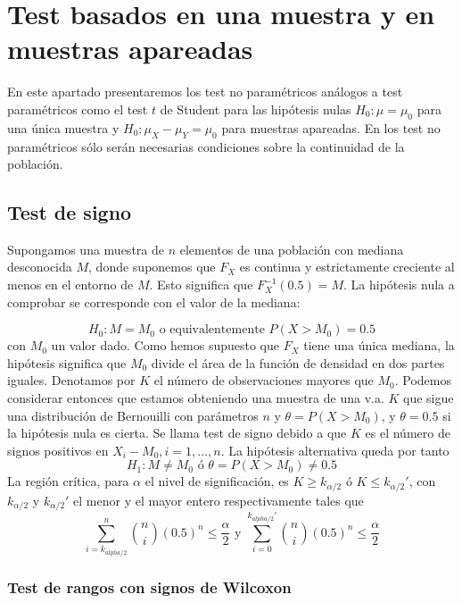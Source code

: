 \section{Test basados en una muestra y en muestras apareadas}
	
	En este apartado presentaremos los test no paramétricos 
análogos a test paramétricos como el test $t$ de Student para 
las hipótesis nulas $H_0: \mu = \mu_0$ para una única muestra 
y $H_0: \mu_X - \mu_Y = \mu_0$ para muestras apareadas. En 
los test no paramétricos sólo serán necesarias condiciones 
sobre la continuidad de la población. 
	
\subsection{Test de signo}

	Supongamos una muestra de $n$ elementos de una población 
con mediana desconocida $M$, donde suponemos que $F_X$ 
es continua y estrictamente creciente al menos en el entorno 
de $M$. Esto significa que $F_X^{-1}(0.5) = M$. La hipótesis 
nula a comprobar se corresponde con el valor de la mediana:

	\[ H_0: M = M_0	\text{ o equivalentemente }
			P(X > M_0) = 0.5 \]
	con $M_0$ un valor dado. Como hemos supuesto que $F_X$ 
tiene una única mediana, la hipótesis significa que $M_0$ 
divide el área de la función de densidad en dos partes 
iguales. Denotamos por $K$ el número de observaciones mayores 
que $M_0$. Podemos considerar entonces que estamos obteniendo 
una muestra de una v.a. $K$ que sigue una distribución de 
Bernouilli con parámetros $n$ y $\theta=P(X>M_0)$, y 
$\theta=0.5$ si la hipótesis nula es cierta. Se llama test de 
signo debido a que $K$ es el número de signos positivos en 
$X_i - M_0, i = 1, \dots, n$. La hipótesis alternativa queda 
por tanto
	\[ H_1: M \neq M_0	\text{ ó }
			\theta = P(X > M_0) \neq 0.5 \]
	La región crítica, para $\alpha$ el nivel de 
significación, es $K \geq k_{\alpha/2}$ ó $K \leq 
k_{\alpha/2}'$, con $k_{\alpha/2}$ y $k_{\alpha/2}'$ el menor 
y el mayor entero respectivamente tales que
	\[ \sum\limits_{i=k_{alpha/2}}^n
			{n \choose i}(0.5)^n \leq \frac{\alpha}{2}
		\text{ y }
		\sum\limits_{i=0}^{k_{alpha/2}'}
			{n \choose i}(0.5)^n \leq \frac{\alpha}{2}
	\]

\subsubsection{Test de rangos con signos de Wilcoxon}

